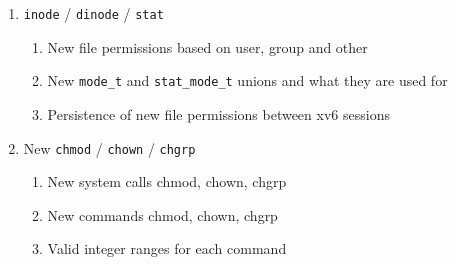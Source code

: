 \documentclass[11pt,letterpaper]{report}
\begin{document}
                                                    \begin{enumerate}
                                                          \item {\tt inode} / {\tt dinode} / {\tt stat}
                                                                      \begin{enumerate}
                                                                                      \item New file permissions based on user, group and other
                                                                                                      \item New {\tt mode\_t} and {\tt stat\_mode\_t} unions and what they are used for
                                                                                                                      \item Persistence of new file permissions between xv6 sessions
                                                                                                                                  \end{enumerate}
                                                                                                                                          
                                                                                                                                                \item New {\tt chmod} / {\tt chown} / {\tt chgrp}
                                                                                                                                                            \begin{enumerate}
                                                                                                                                                                            \item New system calls chmod, chown, chgrp
                                                                                                                                                                                            \item New commands chmod, chown, chgrp
                                                                                                                                                                                                            \item Valid integer ranges for each command
                                                                                                                                                                                                                        \end{enumerate}
                                                                                                                                                                                                                                    

\end{enumerate}
\end{document}
